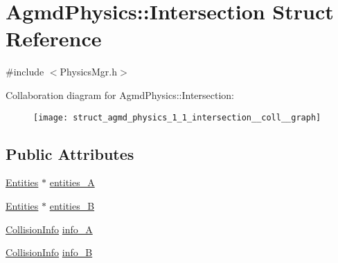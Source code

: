 \hypertarget{struct_agmd_physics_1_1_intersection}{\section{Agmd\+Physics\+:\+:Intersection Struct Reference}
\label{struct_agmd_physics_1_1_intersection}
}


{\ttfamily \#include $<$Physics\+Mgr.\+h$>$}



Collaboration diagram for Agmd\+Physics\+:\+:Intersection\+:\nopagebreak
\begin{figure}[H]
\begin{center}
\leavevmode
\texttt{[image: struct\_agmd\_physics\_1\_1\_intersection\_\_coll\_\_graph]}
\end{center}
\end{figure}
\subsection*{Public Attributes}
\begin{DoxyCompactItemize}
\item 
\hyperlink{class_agmd_physics_1_1_entities}{Entities} $\ast$ \hyperlink{struct_agmd_physics_1_1_intersection_a9cafc5c5df19e5fd0298cd729c572979}{entities\+\_\+\+A}
\item 
\hyperlink{class_agmd_physics_1_1_entities}{Entities} $\ast$ \hyperlink{struct_agmd_physics_1_1_intersection_a33fed9da6f6bc16c429b64633e653fb4}{entities\+\_\+\+B}
\item 
\hyperlink{struct_agmd_physics_1_1_collision_info}{Collision\+Info} \hyperlink{struct_agmd_physics_1_1_intersection_a4526df92d5b254303c370cae1d0d2231}{info\+\_\+\+A}
\item 
\hyperlink{struct_agmd_physics_1_1_collision_info}{Collision\+Info} \hyperlink{struct_agmd_physics_1_1_intersection_a24aca6ffedcb44b723b5ae33ec16cd44}{info\+\_\+\+B}
\end{DoxyCompactItemize}



